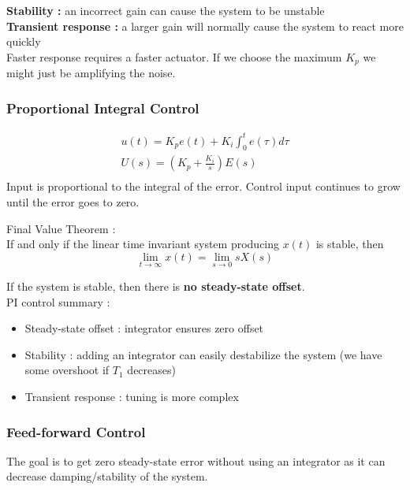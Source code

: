 \documentclass[../main.tex]{subfiles}
\begin{document}
\textbf{Stability :} an incorrect gain can cause the system to be unstable\\
\textbf{Transient response :} a larger gain will normally cause the system to react more quickly\\

Faster response requires a faster actuator. If we choose the maximum $K_p$ we might just be amplifying the noise.\\

\subsubsection{Proportional Integral Control}
\begin{equation}
    \begin{split}
    u(t) = K_p e(t) + K_i \int_0^t e(\tau) d\tau\\
    U(s) = (K_p + \frac{K_i}{s})E(s)\\
    \end{split}
\end{equation}
Input is proportional to the integral of the error. Control input continues to grow until the error goes to zero.\\

\begin{theorem}
    Final Value Theorem :\\
    If and only if the linear time invariant system producing $x(t)$ is stable, then \begin{equation}
        \lim_{t\rightarrow \infty} x(t) = \lim_{s\rightarrow 0}sX(s)
    \end{equation}
\end{theorem}

If the system is stable, then there is \textbf{no steady-state offset}.\\

PI control summary : \begin{itemize}
    \item Steady-state offset : integrator ensures zero offset\\
    \item Stability : adding an integrator can easily destabilize the system (we have some overshoot if $T_1$ decreases)\\
    \item Transient response : tuning is more complex\\
\end{itemize}

\subsubsection{Feed-forward Control}
The goal is to get zero steady-state error without using an integrator as it can decrease damping/stability of the system.\\
\end{document}
